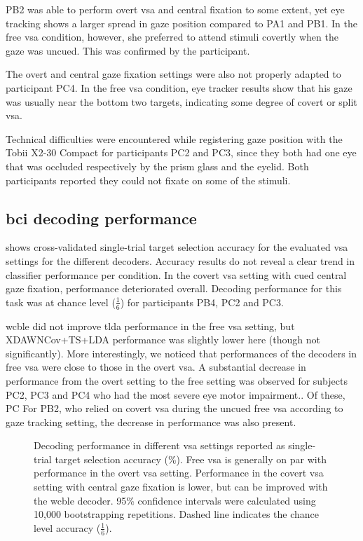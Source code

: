 \documentclass[twocolumn]{article}
\begin{document}
PB2 was able to perform overt \ac{vsa} and central fixation to some extent,
yet eye tracking shows a larger spread in gaze position compared to
PA1 and PB1.
In the free \ac{vsa} condition, however, she preferred to attend
stimuli covertly when the gaze was uncued.
This was confirmed by the participant.

The overt and central gaze fixation settings were also not properly adapted to
participant PC4.
In the free \ac{vsa} condition, eye tracker results show that his gaze was usually near the
bottom two targets, indicating some degree of covert or split \ac{vsa}.

Technical difficulties were encountered while registering gaze position with the Tobii X2-30
Compact for participants PC2 and PC3, since they both had one eye that was
occluded respectively by the prism glass and the eyelid.
Both participants reported they could not fixate on some of the
stimuli.

\subsection{\Acs{bci} decoding performance}

 shows cross-validated single-trial target selection
accuracy for the evaluated \ac{vsa} settings for the different decoders.
Accuracy results do not reveal a clear trend in classifier performance per
condition.
In the covert \ac{vsa} setting with cued central gaze fixation, performance
deteriorated overall.
Decoding performance for this task was at chance level ($\frac{1}{6}$) for
participants PB4, PC2 and PC3.

\Ac{wcble} did not improve \ac{tlda} performance in the free \ac{vsa} setting, but
XDAWNCov+TS+LDA performance was slightly lower here (though not
significantly).
More interestingly, we noticed that performances of the decoders in free
\ac{vsa} were close to those in the overt \ac{vsa}.
A substantial decrease in performance from the overt setting to the free
setting was observed for subjects PC2, PC3 and PC4 who had the most severe eye
motor impairment.. Of these, PC
For PB2, who relied on covert \ac{vsa} during the uncued free \ac{vsa}
according to gaze tracking setting, the decrease in performance was also
present.
\begin{figure}[t]
   
  \caption{%
    Decoding performance in different \ac{vsa} settings reported as
    single-trial target selection accuracy (\%).
    Free \ac{vsa} is generally on par with performance in the overt \ac{vsa}
    setting.
    Performance in the covert \ac{vsa} setting with central gaze fixation is lower, but can
    be improved with the \ac{wcble} decoder.
    95\% confidence intervals were calculated using 10,000 bootstrapping
    repetitions. Dashed line indicates the chance level accuracy
    ($\frac{1}{6}$).
  }
  \label{fig:patients/decode}
\end{figure}
\end{document}
